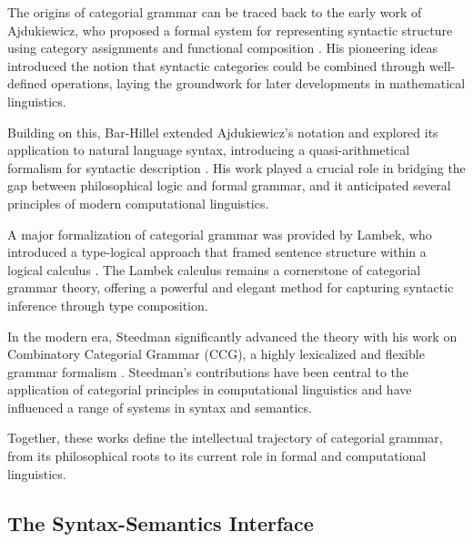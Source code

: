 The origins of categorial grammar can be traced back to the early work of Ajdukiewicz, who proposed a formal system for representing syntactic structure using category assignments and functional composition \cite{ajdukiewicz1935syntaktische}. His pioneering ideas introduced the notion that syntactic categories could be combined through well-defined operations, laying the groundwork for later developments in mathematical linguistics.

Building on this, Bar-Hillel extended Ajdukiewicz's notation and explored its application to natural language syntax, introducing a quasi-arithmetical formalism for syntactic description \cite{barhillel1953quasi}. His work played a crucial role in bridging the gap between philosophical logic and formal grammar, and it anticipated several principles of modern computational linguistics.

A major formalization of categorial grammar was provided by Lambek, who introduced a type-logical approach that framed sentence structure within a logical calculus \cite{lambek1958mathematics}. The Lambek calculus remains a cornerstone of categorial grammar theory, offering a powerful and elegant method for capturing syntactic inference through type composition.

In the modern era, Steedman significantly advanced the theory with his work on Combinatory Categorial Grammar (CCG), a highly lexicalized and flexible grammar formalism \cite{steedman1996surface}. Steedman's contributions have been central to the application of categorial principles in computational linguistics and have influenced a range of systems in syntax and semantics.

Together, these works define the intellectual trajectory of categorial grammar, from its philosophical roots to its current role in formal and computational linguistics.

\subsection{The Syntax-Semantics Interface}
